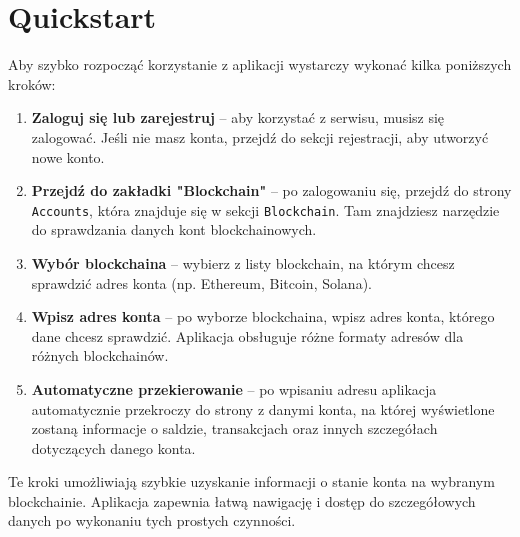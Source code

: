 \section{Quickstart}
Aby szybko rozpocząć korzystanie z aplikacji wystarczy wykonać kilka poniższych kroków:
\begin{enumerate}
    \item \textbf{Zaloguj się lub zarejestruj} -- aby korzystać z serwisu, musisz się zalogować. Jeśli nie masz konta, przejdź do sekcji rejestracji, aby utworzyć nowe konto.
    
    \item \textbf{Przejdź do zakładki "Blockchain"} -- po zalogowaniu się, przejdź do strony \texttt{Accounts}, która znajduje się w sekcji \texttt{Blockchain}. Tam znajdziesz narzędzie do sprawdzania danych kont blockchainowych.
    
    \item \textbf{Wybór blockchaina} -- wybierz z listy blockchain, na którym chcesz sprawdzić adres konta (np. Ethereum, Bitcoin, Solana).
    
    \item \textbf{Wpisz adres konta} -- po wyborze blockchaina, wpisz adres konta, którego dane chcesz sprawdzić. Aplikacja obsługuje różne formaty adresów dla różnych blockchainów.
    
    \item \textbf{Automatyczne przekierowanie} -- po wpisaniu adresu aplikacja automatycznie przekroczy do strony z danymi konta, na której wyświetlone zostaną informacje o saldzie, transakcjach oraz innych szczegółach dotyczących danego konta.
\end{enumerate}
Te kroki umożliwiają szybkie uzyskanie informacji o stanie konta na wybranym blockchainie. Aplikacja zapewnia łatwą nawigację i dostęp do szczegółowych danych po wykonaniu tych prostych czynności.
